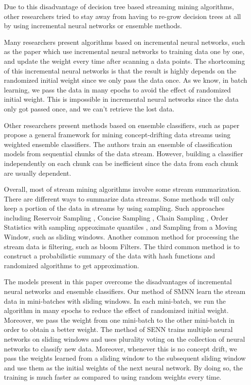 \documentclass[conference]{IEEEtran}
\begin{document}
		Due to this disadvantage of decision tree based streaming mining algorithms, other researchers tried to stay away from having to re-grow decision trees at all by using incremental neural networks or ensemble methods.
		
		Many researchers present algorithms based on incremental neural networks, such as the paper \cite{NN1,NN2,NN3,NN4} which use incremental neural networks to training data one by one, and update the weight every time after scanning a data points. The shortcoming of this incremental neural networks is that the result is highly depends on the randomized initial weight since we only pass the data once. As we know, in batch learning, we pass the data in many epochs to avoid the effect of randomized initial weight. This is impossible in incremental neural networks since the data only got passed once, and we can't retrieve the lost data.
		
		Other researchers present methods based on ensemble classifiers, such as paper \cite{ensemble1} propose a general framework for mining concept-drifting data streams using weighted ensemble classifiers. The authors train an ensemble of classification models from sequential chunks of the data stream. However, building a classifier independently on each chunk can be inefficient since the data from each chunk are usually dependent. 
		
		Overall, most of stream mining algorithms involve some stream summarization. There are different ways to summarize data streams. Some methods will only keep a portion of the data in streams by using sampling. Such approaches including Reservoir Sampling \cite{vitter}, Concise Sampling \cite{Gibbons}, Chain Sampling \cite{Babcock}, Order Statistics with sampling approximate quantiles \cite{Manku}, and Sampling from a Moving Window, such as sliding windows. Another common method for processing the stream data is filtering, such as bloom Filters. The third common method is to construct a probabilistic summary of the data with hash functions and randomized algorithms to get approximation. 
		
		
		The models present in this paper overcome the disadvantages of incremental neural networks and ensemble classifiers.  Our method of SMNN learn the stream data in mini-batches with sliding windows. In each mini-batch, we run the algorithm in many epochs to reduce the effect of randomized initial weight. Moreover, we pass the weight from one mini-batch to the other mini-batch in order to obtain a better weight. The method of SENN trains multiple neural networks on sliding windows and uses plurality voting on the collection of neural networks to classify new data. Moreover, whenever this is no concept drift, we pass the weights learned from a sliding window to the subsequent sliding window and use them as the initial weights of the next neural network. By doing so, the training  is much faster as compared to using random weights every time. 
		
\end{document}
